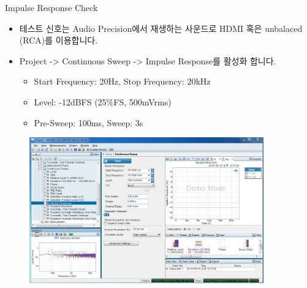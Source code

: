 \documentclass{beamer}
\begin{document}
	
	\begin{frame}[t]{Impulse Response Check}
		\begin{itemize}
			\item 테스트 신호는 Audio Precision에서 재생하는 사운드로 HDMI 혹은 unbalaced (RCA)를 이용합니다.
			\item Project -> Continuous Sweep -> Impulse Response를 활성화 합니다.
			\begin{itemize}
				\item Start Frequency: 20Hz, Stop Frequency: 20kHz
				\item Level: -12dBFS (25\%FS, 500mVrms)
				\item Pre-Sweep: 100ms, Sweep: 3s
			\end{itemize}
		\end{itemize}
		
		\begin{figure}[r]
			\includegraphics[width=0.9\textwidth]{figure/apsetting/impulseResponse.png}
		\end{figure}
		
	\end{frame}
	
	
	
\end{document}
